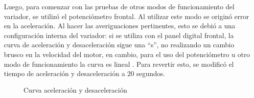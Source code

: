 Luego, para comenzar con las pruebas de otros modos de funcionamiento del variador, se utilizó el potenciómetro frontal. Al utilizar este modo se originó error en la aceleración.   Al hacer las averiguaciones pertinentes, esto se debió a una configuración interna del variador: si se utiliza con el panel digital frontal, la curva de aceleración y desaceleración sigue una “s”, no realizando un cambio brusco en la velocidad del motor, en cambio, para el uso del potenciómetro u otro modo de funcionamiento la curva es lineal . Para revertir esto, se modificó el tiempo de aceleración y desaceleración a 20 segundos.

\begin{figure}[htbp]
	\centering
	\caption{Curva aceleración y desaceleración} \label{fig:curva}
\end{figure}

\newpage